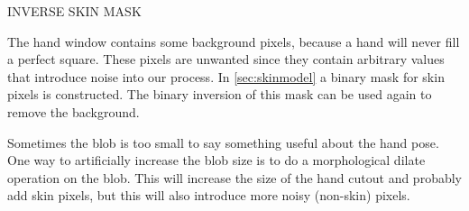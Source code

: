 \begin{figure}[htbp]
\begin{center}
\hspace{0.03\linewidth}
\hspace{0.03\linewidth}
\end{center}
\end{figure}

INVERSE SKIN MASK

The hand window contains some background pixels, because a hand will never fill a perfect square. These pixels are unwanted since they contain arbitrary values that introduce noise into our process. In \autoref{sec:skinmodel} a binary mask for skin pixels is constructed. The binary inversion of this mask can be used again to remove the background.

Sometimes the blob is too small to say something useful about the hand pose. One way to artificially increase the blob size is to do a morphological dilate operation on the blob. This will increase the size of the hand cutout and probably add skin pixels, but this will also introduce more noisy (non-skin) pixels.

